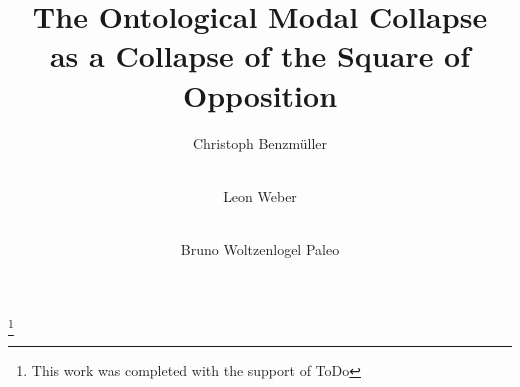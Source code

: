 \documentclass{birkjour}
\theoremstyle{definition}
\theoremstyle{remark}
\numberwithin{equation}{section}
\begin{document}
%
%
%
%
%
%
%
%
%


\title[Modal Collapse]
 {The Ontological Modal Collapse \\ 
 as a Collapse of the Square of Opposition}



\author[Benzm\"uller]{Christoph Benzm\"uller}

\address{%
Department of Mathematics and Computer Science\\
Arnimallee 7 \\
Room 115 \\
14195 Berlin \\
Germany
}


\thanks{This work was completed with the support of ToDo}


\author[Weber]{\\ Leon Weber}
\address{ 
ToDo \\
ToDo \\
ToDo Berlin \\
Germany
}


\author[Woltzenlogel-Paleo]{\\ Bruno Woltzenlogel Paleo}
\address{ 
Favoritenstra{\ss}e 9 \\
Room HA0402 \\
1040 Wien \\
Austria
}





\end{document}
